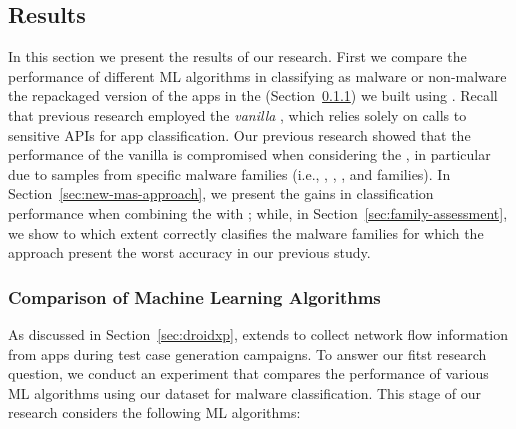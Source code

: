 \subsection{Results}\label{sec:results}




In this section we present the results of our research.
First we compare the performance of different ML algorithms in classifying
as malware or non-malware the repackaged version of the apps in the \fds (Section~\ref{sec:ml}) we
built using \droidxpflow.
Recall that previous research employed the \emph{vanilla}
\mas, which relies solely on calls to sensitive APIs for app classification. Our previous
research showed that the performance of the vanilla \mas is compromised when considering
the \cds, in particular due to samples from specific malware families (i.e., \gps, \rmb, \dwg, and \tjk families).
In Section~\ref{sec:new-mas-approach}, we present the gains in classification performance when combining
the \mas with \droidxpflow; while, in Section~\ref{sec:family-assessment}, we show to which extent
\droidxpflow correctly clasifies the malware families for which the \mas approach
present the worst accuracy in our previous study.

\subsubsection{Comparison of Machine Learning Algorithms}\label{sec:ml}

As discussed in Section~\ref{sec:droidxp}, \droidxpflow extends \droidxp to collect network
flow information from apps during test case generation campaigns. To answer our fitst research question,
we conduct an experiment that compares the performance of various ML algorithms using our \fds dataset
for malware classification. This stage of our research considers the following ML algorithms:

